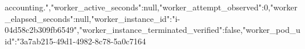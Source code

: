 \documentclass[10pt]{article}
\begin{document}
\allowbreak{}a\allowbreak{}c\allowbreak{}c\allowbreak{}o\allowbreak{}u\allowbreak{}n\allowbreak{}t\allowbreak{}i\allowbreak{}n\allowbreak{}g\allowbreak{}.\allowbreak{}"\allowbreak{},\allowbreak{}"\allowbreak{}w\allowbreak{}o\allowbreak{}r\allowbreak{}k\allowbreak{}e\allowbreak{}r\allowbreak{}\_\allowbreak{}a\allowbreak{}c\allowbreak{}t\allowbreak{}i\allowbreak{}v\allowbreak{}e\allowbreak{}\_\allowbreak{}s\allowbreak{}e\allowbreak{}c\allowbreak{}o\allowbreak{}n\allowbreak{}d\allowbreak{}s\allowbreak{}"\allowbreak{}:\allowbreak{}n\allowbreak{}u\allowbreak{}l\allowbreak{}l\allowbreak{},\allowbreak{}"\allowbreak{}w\allowbreak{}o\allowbreak{}r\allowbreak{}k\allowbreak{}e\allowbreak{}r\allowbreak{}\_\allowbreak{}a\allowbreak{}t\allowbreak{}t\allowbreak{}e\allowbreak{}m\allowbreak{}p\allowbreak{}t\allowbreak{}\_\allowbreak{}o\allowbreak{}b\allowbreak{}s\allowbreak{}e\allowbreak{}r\allowbreak{}v\allowbreak{}e\allowbreak{}d\allowbreak{}"\allowbreak{}:\allowbreak{}0\allowbreak{},\allowbreak{}"\allowbreak{}w\allowbreak{}o\allowbreak{}r\allowbreak{}k\allowbreak{}e\allowbreak{}r\allowbreak{}\_\allowbreak{}e\allowbreak{}l\allowbreak{}a\allowbreak{}p\allowbreak{}s\allowbreak{}e\allowbreak{}d\allowbreak{}\_\allowbreak{}s\allowbreak{}e\allowbreak{}c\allowbreak{}o\allowbreak{}n\allowbreak{}d\allowbreak{}s\allowbreak{}"\allowbreak{}:\allowbreak{}n\allowbreak{}u\allowbreak{}l\allowbreak{}l\allowbreak{},\allowbreak{}"\allowbreak{}w\allowbreak{}o\allowbreak{}r\allowbreak{}k\allowbreak{}e\allowbreak{}r\allowbreak{}\_\allowbreak{}i\allowbreak{}n\allowbreak{}s\allowbreak{}t\allowbreak{}a\allowbreak{}n\allowbreak{}c\allowbreak{}e\allowbreak{}\_\allowbreak{}i\allowbreak{}d\allowbreak{}"\allowbreak{}:\allowbreak{}"\allowbreak{}i\allowbreak{}-\allowbreak{}0\allowbreak{}4\allowbreak{}d\allowbreak{}5\allowbreak{}8\allowbreak{}c\allowbreak{}2\allowbreak{}b\allowbreak{}3\allowbreak{}0\allowbreak{}9\allowbreak{}f\allowbreak{}b\allowbreak{}6\allowbreak{}5\allowbreak{}4\allowbreak{}9\allowbreak{}"\allowbreak{},\allowbreak{}"\allowbreak{}w\allowbreak{}o\allowbreak{}r\allowbreak{}k\allowbreak{}e\allowbreak{}r\allowbreak{}\_\allowbreak{}i\allowbreak{}n\allowbreak{}s\allowbreak{}t\allowbreak{}a\allowbreak{}n\allowbreak{}c\allowbreak{}e\allowbreak{}\_\allowbreak{}t\allowbreak{}e\allowbreak{}r\allowbreak{}m\allowbreak{}i\allowbreak{}n\allowbreak{}a\allowbreak{}t\allowbreak{}e\allowbreak{}d\allowbreak{}\_\allowbreak{}v\allowbreak{}e\allowbreak{}r\allowbreak{}i\allowbreak{}f\allowbreak{}i\allowbreak{}e\allowbreak{}d\allowbreak{}"\allowbreak{}:\allowbreak{}f\allowbreak{}a\allowbreak{}l\allowbreak{}s\allowbreak{}e\allowbreak{},\allowbreak{}"\allowbreak{}w\allowbreak{}o\allowbreak{}r\allowbreak{}k\allowbreak{}e\allowbreak{}r\allowbreak{}\_\allowbreak{}p\allowbreak{}o\allowbreak{}d\allowbreak{}\_\allowbreak{}u\allowbreak{}i\allowbreak{}d\allowbreak{}"\allowbreak{}:\allowbreak{}"\allowbreak{}3\allowbreak{}a\allowbreak{}7\allowbreak{}a\allowbreak{}b\allowbreak{}2\allowbreak{}1\allowbreak{}5\allowbreak{}-\allowbreak{}4\allowbreak{}9\allowbreak{}d\allowbreak{}1\allowbreak{}-\allowbreak{}4\allowbreak{}9\allowbreak{}8\allowbreak{}2\allowbreak{}-\allowbreak{}8\allowbreak{}c\allowbreak{}7\allowbreak{}8\allowbreak{}-\allowbreak{}5\allowbreak{}a\allowbreak{}0\allowbreak{}c\allowbreak{}7\allowbreak{}1\allowbreak{}6\allowbreak{}4\allo
\end{document}

